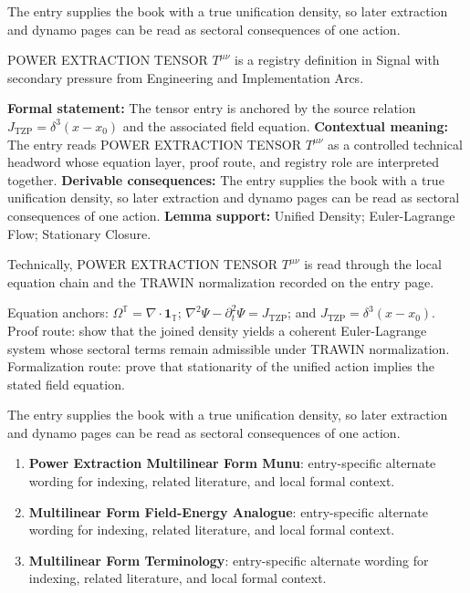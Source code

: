 The entry supplies the book with a true unification density, so later extraction and dynamo pages can be read as sectoral consequences of one action.
\clearpage


\begingroup\small
{}
POWER EXTRACTION TENSOR \(T^{\mu\nu}\) is a registry definition in Signal with secondary pressure from Engineering and Implementation Arcs.

\begingroup\footnotesize\setlength{\emergencystretch}{3em}\sloppy
\textbf{Formal statement:} The tensor entry is anchored by the source relation \(J_{\mathrm{TZP}}=\delta^3(x-x_0)\) and the associated field equation. \textbf{Contextual meaning:} The entry reads POWER EXTRACTION TENSOR \(T^{\mu\nu}\) as a controlled technical headword whose equation layer, proof route, and registry role are interpreted together. \textbf{Derivable consequences:} The entry supplies the book with a true unification density, so later extraction and dynamo pages can be read as sectoral consequences of one action. \textbf{Lemma support:} Unified Density; Euler-Lagrange Flow; Stationary Closure.\par
\endgroup

Technically, POWER EXTRACTION TENSOR \(T^{\mu\nu}\) is read through the local equation chain and the TRAWIN normalization recorded on the entry page.

Equation anchors: \(\Omega^{\mathbb{T}}=\nabla\cdot\mathbf{1}_{\mathbb{T}}\); \(\nabla^2\Psi-\partial_t^2\Psi=J_{\mathrm{TZP}}\); and \(J_{\mathrm{TZP}}=\delta^3(x-x_0)\). Proof route: show that the joined density yields a coherent Euler-Lagrange system whose sectoral terms remain admissible under TRAWIN normalization. Formalization route: prove that stationarity of the unified action implies the stated field equation.

The entry supplies the book with a true unification density, so later extraction and dynamo pages can be read as sectoral consequences of one action.
\endgroup

\begin{enumerate}[leftmargin=1.6em,itemsep=6pt,topsep=4pt]
\item \textbf{Power Extraction Multilinear Form Munu}: entry-specific alternate wording for indexing, related literature, and local formal context.
\item \textbf{Multilinear Form Field-Energy Analogue}: entry-specific alternate wording for indexing, related literature, and local formal context.
\item \textbf{Multilinear Form Terminology}: entry-specific alternate wording for indexing, related literature, and local formal context.
\end{enumerate}

